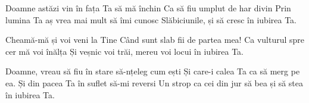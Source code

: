 
\beginverse
Doamne astăzi vin în fața Ta să mă închin
Ca să fiu umplut de har divin
Prin lumina Ta aș vrea mai mult să îmi cunosc
Slăbiciunile, și să cresc în iubirea Ta.
\endverse

\beginchorus
Cheamă-mă și voi veni la Tine
Când sunt slab fii de partea mea!
Ca vulturul spre cer mă voi înălța
Și veșnic voi trăi, mereu voi locui în iubirea Ta.
\endchorus

\beginverse
Doamne, vreau să fiu în stare să-nțeleg cum ești
Și care-i calea Ta ca să merg pe ea.
Și din pacea Ta în suflet să-mi reversi
Un strop ca cei din jur să bea și să stea în iubirea Ta.
\endverse

\endsong